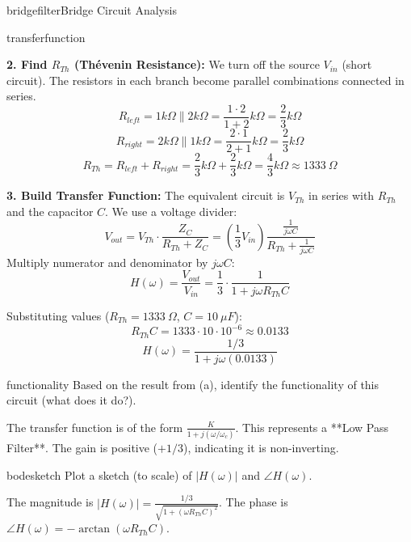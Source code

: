 \begin{mainquestion}{bridgefilter}{Bridge Circuit Analysis}
\begin{partquestion}{transferfunction}
\begin{answer}[3in]
        \textbf{2. Find $R_{Th}$ (Thévenin Resistance):}
        We turn off the source $V_{in}$ (short circuit). The resistors in each branch become parallel combinations connected in series.
        \[R_{left} = 1k\Omega \parallel 2k\Omega = \frac{1 \cdot 2}{1 + 2} k\Omega = \frac{2}{3} k\Omega\]
        \[R_{right} = 2k\Omega \parallel 1k\Omega = \frac{2 \cdot 1}{2 + 1} k\Omega = \frac{2}{3} k\Omega\]
        \[R_{Th} = R_{left} + R_{right} = \frac{2}{3} k\Omega + \frac{2}{3} k\Omega = \frac{4}{3} k\Omega \approx 1333~\Omega\]

        \textbf{3. Build Transfer Function:}
        The equivalent circuit is $V_{Th}$ in series with $R_{Th}$ and the capacitor $C$. We use a voltage divider:
        \[V_{out} = V_{Th} \cdot \frac{Z_C}{R_{Th} + Z_C} = \left(\frac{1}{3}V_{in}\right) \frac{\frac{1}{j\omega C}}{R_{Th} + \frac{1}{j\omega C}}\]
        Multiply numerator and denominator by $j\omega C$:
        \[H(\omega) = \frac{V_{out}}{V_{in}} = \frac{1}{3} \cdot \frac{1}{1 + j\omega R_{Th} C}\]
        
        Substituting values ($R_{Th} = 1333~\Omega$, $C = 10~\mu F$):
        \[R_{Th}C = 1333 \cdot 10 \cdot 10^{-6} \approx 0.0133\]
        \[H(\omega) = \frac{1/3}{1 + j\omega(0.0133)}\]
\end{answer}

\end{partquestion}

\begin{partquestion}{functionality}
{Based on the result from (a), identify the functionality of this circuit (what does it do?).}

\begin{answer}[0.5in]
        The transfer function is of the form $\frac{K}{1 + j(\omega/\omega_c)}$. This represents a **Low Pass Filter**. The gain is positive ($+1/3$), indicating it is non-inverting.
\end{answer}

\end{partquestion}

\begin{partquestion}{bodesketch}
{Plot a sketch (to scale) of $|H(\omega)|$ and $\angle H(\omega)$.}

\begin{answer}[4.5in]
        The magnitude is $|H(\omega)| = \frac{1/3}{\sqrt{1 + (\omega R_{Th} C)^2}}$.
        The phase is $\angle H(\omega) = -\arctan(\omega R_{Th} C)$.
        

\end{answer}
\end{partquestion}
\end{mainquestion}
